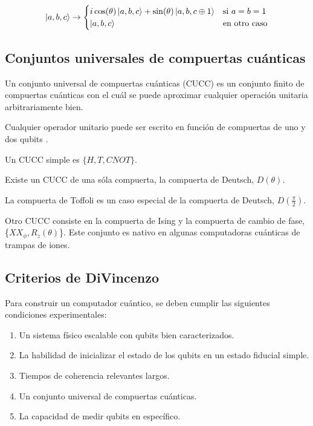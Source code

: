 \begin{enumerate}
\[
    \ket{a,b,c} \rightarrow
    \begin{cases}
        i \cos(\theta) \ket{a,b,c} + \sin(\theta) \ket{a,b,c \oplus 1} & \text{si } a=b=1 \\
        \ket{a,b,c} & \text{en otro caso}
    \end{cases}
\]

\subsection{Conjuntos universales de compuertas cuánticas}
Un conjunto universal de compuertas cuánticas (CUCC) es un conjunto finito de compuertas cuánticas con el cuál se puede aproximar cualquier operación unitaria arbitrariamente bien.
\vspace{0.5cm}

Cualquier operador unitario puede ser escrito en función de compuertas de uno y dos qubits \cite{barenco}.
\vspace{0.5cm}

Un CUCC simple es $\{H,T,\mathit{CNOT}\}$.
\vspace{0.5cm}

Existe un CUCC de una sóla compuerta, la compuerta de Deutsch, $D(\theta)$.
\vspace{0.5cm}

La compuerta de Toffoli es un caso especial de la compuerta de Deutsch, $D(\frac{\pi}{2})$.
\vspace{0.5cm}

Otro CUCC consiste en la compuerta de Ising y la compuerta de cambio de fase, \{$\mathit{XX}_\phi,R_z(\theta)$\}. Este conjunto es nativo en algunas computadoras cuánticas de trampas de iones.

\subsection{Criterios de DiVincenzo}
Para construir un computador cuántico, se deben cumplir las siguientes condiciones experimentales:

\begin{enumerate}
    \item Un sistema físico escalable con qubits bien caracterizados.
    \item La habilidad de inicializar el estado de los qubits en un estado fiducial simple.
    \item Tiempos de coherencia relevantes largos.
    \item Un conjunto universal de compuertas cuánticas.
    \item La capacidad de medir qubits en específico.
\end{enumerate}


\end{enumerate}
